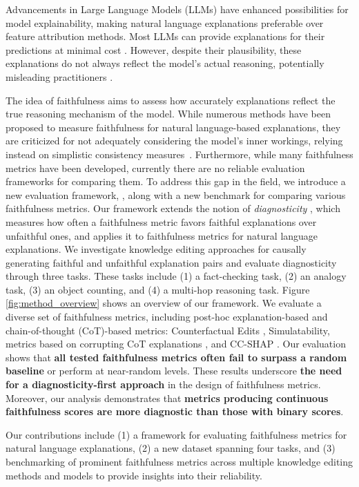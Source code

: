 
Advancements in Large Language Models (LLMs) have enhanced possibilities for model explainability, making natural language explanations preferable over feature attribution methods. Most LLMs can provide explanations for their predictions at minimal cost \citep{Wei2022ChainOT}. However, despite their plausibility, these explanations do not always reflect the model’s actual reasoning, potentially misleading practitioners \citep{Turpin2023LanguageMD}.

The idea of faithfulness aims to assess how accurately explanations reflect the true reasoning mechanism of the model. While numerous methods have been proposed to measure faithfulness for natural language-based explanations, they are criticized for not adequately considering the model's inner workings, relying instead on simplistic consistency measures~\citep{Parcalabescu2023OnMF}. Furthermore, while many faithfulness metrics have been developed, currently there are no reliable evaluation frameworks for comparing them. To address this gap in the field, we introduce a new evaluation framework, \methodname, along with a new benchmark for comparing various faithfulness metrics. Our framework extends the notion of \textit{diagnosticity} \citep{Chan2022ACS}, which measures how often a faithfulness metric favors faithful explanations over unfaithful ones, and applies it to faithfulness metrics for natural language explanations. We investigate knowledge editing approaches for causally generating faithful and unfaithful explanation pairs and evaluate diagnosticity through three tasks. These tasks include (1) a fact-checking task, (2) an analogy task, (3) an object counting, and (4) a multi-hop reasoning task. Figure \ref{fig:method_overview} shows an overview of our framework. We evaluate a diverse set of faithfulness metrics, including post-hoc explanation-based and chain-of-thought (CoT)-based metrics: Counterfactual Edits \citep{Atanasova2023FaithfulnessTF}, Simulatability, metrics based on corrupting CoT explanations \citep{Lanham2023MeasuringFI}, and CC-SHAP \citep{Parcalabescu2023OnMF}. Our evaluation shows that \textbf{all tested faithfulness metrics often fail to surpass a random baseline} or perform at near-random levels. These results underscore \textbf{the need for a diagnosticity-first approach} in the design of faithfulness metrics. Moreover, our analysis demonstrates that \textbf{metrics producing continuous faithfulness scores are more diagnostic than those with binary scores}. 

Our contributions include (1) a framework for evaluating faithfulness metrics for natural language explanations, (2) a new dataset spanning four tasks, and (3) benchmarking of prominent faithfulness metrics across multiple knowledge editing methods and models to provide insights into their reliability.



